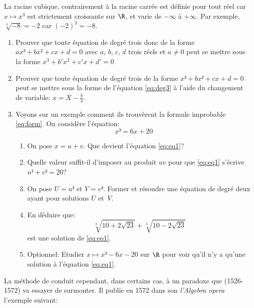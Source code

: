 \documentclass[a4paper]{article}
\begin{document}
La racine cubique, contrairement \`a la racine carr\'ee est d\'efinie
pour tout r\'eel car $x\mapsto x^3$ est strictement croissante sur
$\R$, et varie de $-\infty$ \`a $+\infty$. Par exemple,
$\sqrt[3]{-8}=-2$ car $(-2)^3=-8$.
\begin{enumerate}
\item Prouver que toute \'equation de degr\'e trois donc de la forme
  $ax³+bx²+cx+d=0$ avec $a$, $b$, $c$, $d$ trois r\'eels et $a\neq 0$
  peut se mettre sous la forme $x^3+b'x^2+c'x+d'=0$
\item Prouver que toute \'equation de degr\'e trois de la forme
  $x³+bx²+cx+d=0$ peut se mettre sous la forme de l'\'equation
  \eqref{eq:deg3} \`a l'aide du changement de variable:
  $x=X-\frac{b}{3}$.

\item Voyons sur un exemple comment ils trouv\`erent la formule
  improbable \eqref{eq:form}. On consid\`ere l'\'equation:
  \begin{equation}
    \label{eq:eq1}
    x³=6x+20
  \end{equation}
  \begin{enumerate}
  \item On pose $x=u+v$. Que devient l'\'equation \eqref{eq:eq1}?
  \item Quelle valeur suffit-il d'imposer au produit $uv$ pour que
    \eqref{eq:eq1} s'\'ecrive $u³+v³=20$?
  \item On pose $U=u³$ et $V=v³$. Former et r\'esoudre une \'equation
    de degr\'e deux ayant pour solutions $U$ et~$V$.

  \item En d\'eduire que:
\[ \sqrt[3]{10+2\sqrt{23}} + \sqrt[3]{10-2\sqrt{23}}\]
est une solution de \eqref{eq:eq1}.

\item Optionnel: Etudier $x\mapsto x³-6x-20$ sur $\R$ pour voir qu'il
  n'y a qu'une solution \`a l'\'equation \eqref{eq:eq1}.
  \end{enumerate}

\end{enumerate}
La m\'ethode de  conduit cependant, dans certains cas,
\`a un paradoxe que (1526-1572) va essayer de surmonter. Il publie en
1572 dans son \emph{l'Algebra opera} l'exemple suivant:
\end{document}
